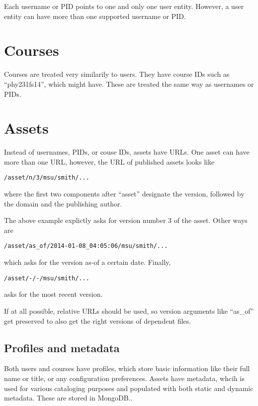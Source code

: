 Each username or PID points to one and only one user entity. However, a user entity can have more than one supported username or PID.
\section{Courses}
Courses are treated very similarily to users. They have course IDs such as ``phy231fs14'', which might have. These are treated the same way as usernames or PIDs.
\section{Assets}
Instead of usernames, PIDs, or couse IDs, assets have URLs. One asset can have more than one URL, however, the URL of published assets looks like
\begin{center}
{\tt /asset/n/3/msu/smith/...}
\end{center}
where the first two components after ``asset'' designate the version, followed by the domain and the publishing author.

The above example explictly asks for version number 3 of the asset. Other ways are
\begin{center}
{\tt /asset/as\_of/2014-01-08\_04:05:06/msu/smith/...}
\end{center}
which asks for the version as-of a certain date. Finally,
\begin{center}
{\tt /asset/-/-/msu/smith/...}
\end{center}
asks for the most recent version.

If at all possible, relative URLs should be used, so version arguments like ``as\_of'' get preserved to also get the right versions of dependent files.
\subsection{Profiles and metadata}
Both users and courses have profiles, which store basic information like their full name or title, or any configuration preferences. Assets have metadata, whcih is used for various cataloging purposes and populated with both static and dynamic metadata. These are stored in MongoDB..
